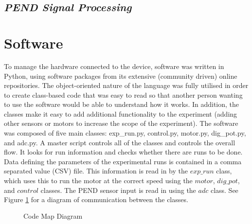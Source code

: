 \documentclass[a4]{report}
\begin{document}
	\subsection{\textit{PEND Signal Processing}}



	\section{Software}
	To manage the hardware connected to the device, software was written in Python, using software packages from its extensive (community driven) online repositories. The object-oriented nature of the language was fully utilised in order to create class-based code that was easy to read so that another person wanting to use the software would be able to understand how it works. In addition, the classes make it easy to add additional functionality to the experiment (adding other sensors or motors to increase the scope of the experiment). The software was composed of five main classes: exp\_run.py, control.py, motor.py, dig\_pot.py, and adc.py. \newline \newline \noindent
	A master script controls all of the classes and controls the overall flow. It looks for run information and checks whether there are runs to be done. Data defining the parameters of the experimental runs is contained in a comma separated value (CSV) file. This information is read in by the \(exp\_run\) class, which uses this to run the motor at the correct speed using the \(motor\), \(dig\_pot\), and \(control\) classes. The PEND sensor input is read in using the \(adc\) class. See Figure \ref{codemap} for a diagram of communication between the classes. \newline 
	\begin{figure}[!h]
		\centering
		\caption{Code Map Diagram}
		\label{codemap}
	\end{figure}
	
\end{document}
